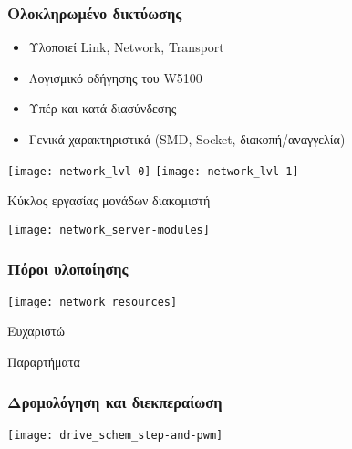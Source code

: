 \documentclass[xetex,mathserif,serif]{beamer}
\begin{document}
\begin{frame}\frametitle
    {Ολοκληρωμένο δικτύωσης}

    \begin{itemize}
    \item Υλοποιεί Link, Network, Transport
    \item Λογισμικό οδήγησης του W5100
    \item Υπέρ και κατά διασύνδεσης
    \item Γενικά χαρακτηριστικά (SMD, Socket, διακοπή\slash{}αναγγελία)
    \end{itemize}

    \begin{center}
    \texttt{[image: network\_lvl-0]}
    \texttt{[image: network\_lvl-1]}
    \end{center}
\end{frame}


\begin{frame}
    {Κύκλος εργασίας μονάδων διακομιστή}

    \begin{center}
    \texttt{[image: network\_server-modules]}
    \end{center}
\end{frame}


\begin{frame}\frametitle
    {Πόροι υλοποίησης}

    \begin{center}
    \texttt{[image: network\_resources]}
    \end{center}
\end{frame}


\begin{frame}[plain]
    \begin{center}
    \begin{block}{Ευχαριστώ}
    \end{block}
    \end{center}
\end{frame}


%
%

\begin{frame}[plain]
    \begin{block}
        {Παραρτήματα}
    \end{block}
\end{frame}



\begin{frame}\frametitle
    {Δρομολόγηση και διεκπεραίωση}

    \begin{center}
    \texttt{[image: drive\_schem\_step-and-pwm]}
    \end{center}
\end{frame}
\end{document}
